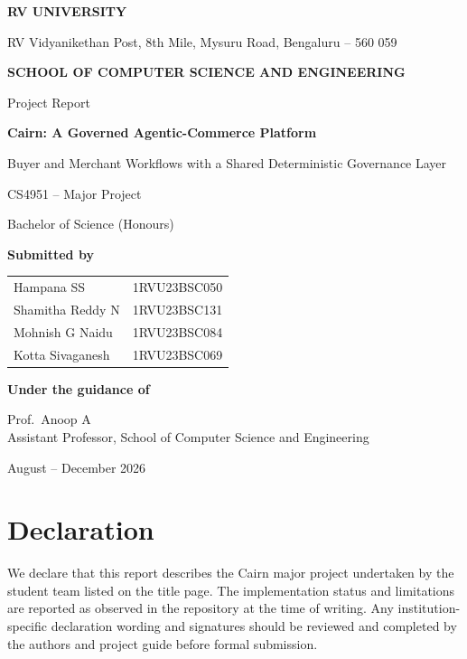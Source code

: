 \documentclass[12pt,a4paper]{report}
\begin{document}
\begin{titlepage}
  \centering
  \vspace*{0.8cm}
  {\Large\bfseries RV UNIVERSITY\par}
  \vspace{0.2cm}
  {\small RV Vidyanikethan Post, 8th Mile, Mysuru Road, Bengaluru -- 560 059\par}
  \vspace{0.65cm}
  {\large\bfseries SCHOOL OF COMPUTER SCIENCE AND ENGINEERING\par}
  \vspace{1.3cm}
  {\Large Project Report\par}
  \vspace{0.5cm}
  {\LARGE\bfseries Cairn: A Governed Agentic-Commerce Platform\par}
  \vspace{0.3cm}
  {\large Buyer and Merchant Workflows with a Shared Deterministic Governance Layer\par}
  \vspace{1.0cm}
  {\large CS4951 -- Major Project\par}
  \vspace{0.25cm}
  {\large Bachelor of Science (Honours)\par}
  \vspace{1.0cm}
  {\large\bfseries Submitted by\par}
  \vspace{0.3cm}
  \begin{tabular}{ll}
    Hampana SS & 1RVU23BSC050 \\
    Shamitha Reddy N & 1RVU23BSC131 \\
    Mohnish G Naidu & 1RVU23BSC084 \\
    Kotta Sivaganesh & 1RVU23BSC069
  \end{tabular}
  \vspace{0.9cm}

  {\large\bfseries Under the guidance of\par}
  \vspace{0.2cm}
  Prof.\ Anoop A\\
  Assistant Professor, School of Computer Science and Engineering

  \vfill
  {\large August -- December 2026\par}
\end{titlepage}


\chapter*{Declaration}
We declare that this report describes the Cairn major project undertaken by
the student team listed on the title page. The implementation status and
limitations are reported as observed in the repository at the time of writing.
Any institution-specific declaration wording and signatures should be reviewed
and completed by the authors and project guide before formal submission.
\end{document}
